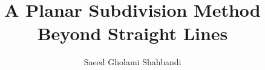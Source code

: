 \documentclass{article}
\title{A Planar Subdivision Method\\
Beyond Straight Lines}%
\author{Saeed Gholami Shahbandi}%
\begin{document}
\maketitle

%
 \newpage
  \newpage

\begin{appendices}

%
\end{appendices}

\newpage


\end{document}
